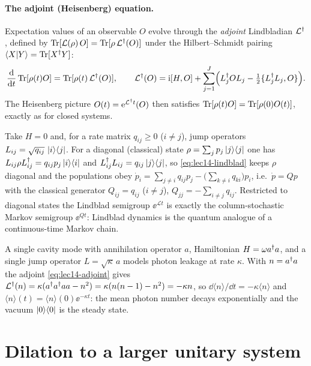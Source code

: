 \paragraph{The adjoint (Heisenberg) equation.}
Expectation values of an observable $O$ evolve through the \emph{adjoint} Lindbladian
$\mathcal L^{\dagger}$, defined by $\operatorname{Tr}[\mathcal L(\rho)\,O]=\operatorname{Tr}[\rho\,\mathcal L^{\dagger}(O)]$ under the
Hilbert--Schmidt pairing $\braket{X|Y}=\operatorname{Tr}[X^{\dagger} Y]$:
\begin{equation}
  \frac{\mathrm{d}}{\mathrm{d} t}\operatorname{Tr}[\rho(t)O]=\operatorname{Tr}[\rho(t)\,\mathcal L^{\dagger}(O)],\qquad
  \mathcal L^{\dagger}(O)=\mathrm{i}[H,O]+\sum_{j=1}^{J}\Bigl(L_j^{\dagger} O L_j-\tfrac12\{L_j^{\dagger} L_j,O\}\Bigr).
  \label{eq:lec14-adjoint}
\end{equation}
The Heisenberg picture $O(t)=\mathrm{e}^{\mathcal L^{\dagger} t}(O)$ then satisfies $\operatorname{Tr}[\rho(t)O]=
\operatorname{Tr}[\rho(0)O(t)]$, exactly as for closed systems.

\begin{example}
\label{exa:lec14-markov}
Take $H=0$ and, for a rate matrix $q_{ij}\ge0$ ($i\ne j$), jump operators
$L_{ij}=\sqrt{q_{ij}}\,\ket{i}\!\bra{j}$. For a diagonal (classical) state
$\rho=\sum_j p_j\ket{j}\!\bra{j}$ one has $L_{ij}\rho L_{ij}^{\dagger}=q_{ij}p_j\ket{i}\!\bra{i}$ and $L_{ij}^{\dagger} L_{ij}
=q_{ij}\ket{j}\!\bra{j}$, so \eqref{eq:lec14-lindblad} keeps $\rho$ diagonal and the populations obey
$\dot p_i=\sum_{j\ne i}q_{ij}p_j-\bigl(\sum_{k\ne i}q_{ki}\bigr)p_i$, i.e.\ $\dot p=Qp$ with the
classical generator $Q_{ij}=q_{ij}$ ($i\ne j$), $Q_{jj}=-\sum_{i\ne j}q_{ij}$. Restricted to
diagonal states the Lindblad semigroup $\ee^{\mathcal L t}$ is exactly the column-stochastic
Markov semigroup $\ee^{Qt}$: Lindblad dynamics is the quantum analogue of a continuous-time
Markov chain.
\end{example}

\begin{example}
\label{exa:lec14-photon}
A single cavity mode with annihilation operator $a$, Hamiltonian $H=\omega a^{\dagger} a$, and a single
jump operator $L=\sqrt\kappa\,a$ models photon leakage at rate $\kappa$. With $n=a^{\dagger} a$ the
adjoint \eqref{eq:lec14-adjoint} gives $\mathcal L^{\dagger}(n)=\kappa(a^{\dagger} a^{\dagger} a a-n^2)=\kappa(n(n-1)
-n^2)=-\kappa n$, so $\dd\langle n\rangle/\dd t=-\kappa\langle n\rangle$ and $\langle n\rangle(t)
=\langle n\rangle(0)\ee^{-\kappa t}$: the mean photon number decays exponentially and the vacuum
$\ket{0}\!\bra{0}$ is the steady state.
\end{example}

\section{Dilation to a larger unitary system}
\label{sec:lec14-2}

